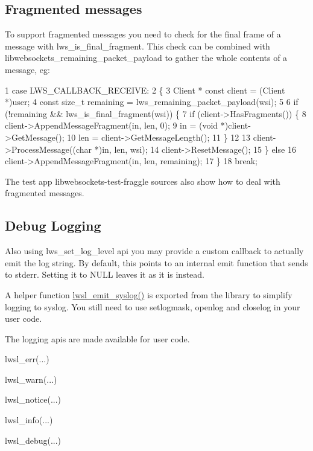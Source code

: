 \subsection*{Fragmented messages }

To support fragmented messages you need to check for the final frame of a message with {\ttfamily lws\+\_\+is\+\_\+final\+\_\+fragment}. This check can be combined with {\ttfamily libwebsockets\+\_\+remaining\+\_\+packet\+\_\+payload} to gather the whole contents of a message, eg\+:


\begin{DoxyCode}
1 case LWS\_CALLBACK\_RECEIVE:
2 \{
3     Client * const client = (Client *)user;
4     const size\_t remaining = lws\_remaining\_packet\_payload(wsi);
5 
6     if (!remaining && lws\_is\_final\_fragment(wsi)) \{
7         if (client->HasFragments()) \{
8             client->AppendMessageFragment(in, len, 0);
9             in = (void *)client->GetMessage();
10             len = client->GetMessageLength();
11         \}
12 
13         client->ProcessMessage((char *)in, len, wsi);
14         client->ResetMessage();
15     \} else
16         client->AppendMessageFragment(in, len, remaining);
17 \}
18 break;
\end{DoxyCode}


The test app libwebsockets-\/test-\/fraggle sources also show how to deal with fragmented messages.

\subsection*{Debug Logging }

Also using {\ttfamily lws\+\_\+set\+\_\+log\+\_\+level} api you may provide a custom callback to actually emit the log string. By default, this points to an internal emit function that sends to stderr. Setting it to {\ttfamily N\+U\+LL} leaves it as it is instead.

A helper function {\ttfamily \hyperlink{group__log_gab7c0fc936cc9f1eb58e2bb234c15147c}{lwsl\+\_\+emit\+\_\+syslog()}} is exported from the library to simplify logging to syslog. You still need to use {\ttfamily setlogmask}, {\ttfamily openlog} and {\ttfamily closelog} in your user code.

The logging apis are made available for user code.


\begin{DoxyItemize}
\item {\ttfamily lwsl\+\_\+err(...)}
\item {\ttfamily lwsl\+\_\+warn(...)}
\item {\ttfamily lwsl\+\_\+notice(...)}
\item {\ttfamily lwsl\+\_\+info(...)}
\item {\ttfamily lwsl\+\_\+debug(...)}
\end{DoxyItemize}

